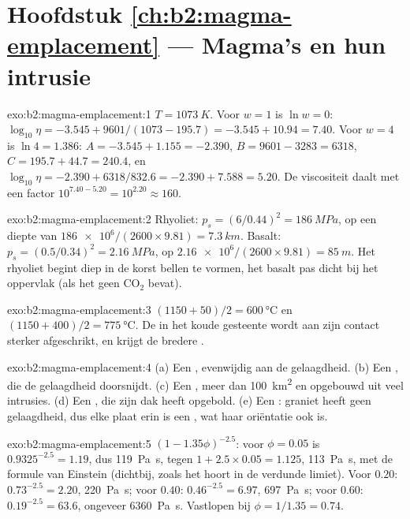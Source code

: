 \section*{Hoofdstuk \ref{ch:b2:magma-emplacement} --- Magma's en hun intrusie}

\begin{solution}{exo:b2:magma-emplacement:1}
$T = \qty{1073}{K}$. Voor $w = 1$ is $\ln w = 0$: $\log_{10}\eta = -3.545 +
9601/(1073 - 195.7) = -3.545 + 10.94 = 7.40$. Voor $w = 4$ is $\ln 4 = 1.386$:
$A = -3.545 + 1.155 = -2.390$, $B = 9601 - 3283 = 6318$, $C = 195.7 + 44.7 =
240.4$, en $\log_{10}\eta = -2.390 + 6318/832.6 = -2.390 + 7.588 = 5.20$. De
viscositeit daalt met een factor $10^{7.40 - 5.20} = 10^{2.20} \approx 160$.
\end{solution}

\begin{solution}{exo:b2:magma-emplacement:2}
Rhyoliet: $p_s = (6/0.44)^2 = \qty{186}{MPa}$, op een diepte van $\num{186e6}/(2600\times9.81)
= \qty{7.3}{km}$. Basalt: $p_s = (0.5/0.34)^2 = \qty{2.16}{MPa}$, op
$\num{2.16e6}/(2600\times9.81) = \qty{85}{m}$. Het rhyoliet begint diep in de korst bellen
te vormen, het basalt pas dicht bij het oppervlak (als het geen CO$_2$ bevat).
\end{solution}

\begin{solution}{exo:b2:magma-emplacement:3}
$(1150 + 50)/2 = \qty{600}{\celsius}$ en $(1150 + 400)/2 = \qty{775}{\celsius}$. De
 in het koude gesteente wordt aan zijn contact sterker afgeschrikt, en krijgt de bredere
.
\end{solution}

\begin{solution}{exo:b2:magma-emplacement:4}
(a) Een , evenwijdig aan de gelaagdheid. (b) Een , die de gelaagdheid doorsnijdt.
(c) Een , meer dan \qty{100}{km^2} en opgebouwd uit veel intrusies.
(d) Een , die zijn dak heeft opgebold. (e) Een : graniet heeft geen gelaagdheid,
dus elke plaat erin is een , wat haar oriëntatie ook is.
\end{solution}

\begin{solution}{exo:b2:magma-emplacement:5}
$(1 - 1.35\phi)^{-2.5}$: voor $\phi = 0.05$ is $0.9325^{-2.5} = 1.19$, dus
\qty{119}{Pa.s}, tegen $1 + 2.5\times0.05 = 1.125$, \qty{113}{Pa.s}, met de formule van
Einstein (dichtbij, zoals het hoort in de verdunde limiet). Voor $0.20$: $0.73^{-2.5} =
2.20$, \qty{220}{Pa.s}; voor $0.40$: $0.46^{-2.5} = 6.97$, \qty{697}{Pa.s}; voor $0.60$:
$0.19^{-2.5} = 63.6$, ongeveer \qty{6360}{Pa.s}. Vastlopen bij $\phi = 1/1.35 = 0.74$.
\end{solution}

